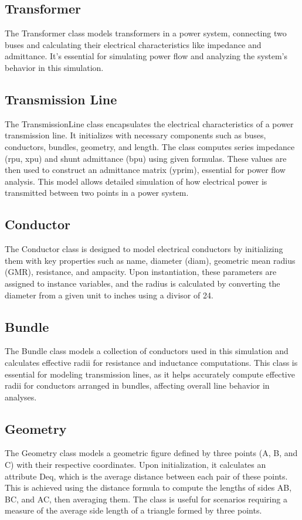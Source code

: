 \documentclass{article}
\begin{document}
	\subsection{Transformer}
	The Transformer class models transformers in a power system, connecting two buses and calculating their electrical characteristics like impedance and admittance. It's essential for simulating power flow and analyzing the system's behavior in this simulation.
	
	\subsection{Transmission Line}
	The TransmissionLine class encapsulates the electrical characteristics of a power transmission line. It initializes with necessary components such as buses, conductors, bundles, geometry, and length. The class computes series impedance (rpu, xpu) and shunt admittance (bpu) using given formulas. These values are then used to construct an admittance matrix (yprim), essential for power flow analysis. This model allows detailed simulation of how electrical power is transmitted between two points in a power system.
	
	\subsection{Conductor}
	The Conductor class is designed to model electrical conductors by initializing them with key properties such as name, diameter (diam), geometric mean radius (GMR), resistance, and ampacity. Upon instantiation, these parameters are assigned to instance variables, and the radius is calculated by converting the diameter from a given unit to inches using a divisor of 24.
	
	\subsection{Bundle}
	The Bundle class models a collection of conductors used in this simulation and calculates effective radii for resistance and inductance computations. This class is essential for modeling transmission lines, as it helps accurately compute effective radii for conductors arranged in bundles, affecting overall line behavior in analyses.
	
	\subsection{Geometry}
	The Geometry class models a geometric figure defined by three points (A, B, and C) with their respective coordinates. Upon initialization, it calculates an attribute Deq, which is the average distance between each pair of these points. This is achieved using the distance formula to compute the lengths of sides AB, BC, and AC, then averaging them. The class is useful for scenarios requiring a measure of the average side length of a triangle formed by three points.
	
\end{document}
